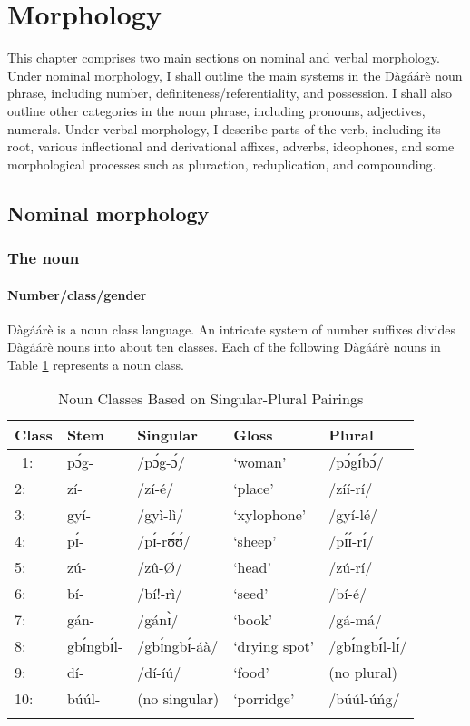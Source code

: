\section{Morphology}

This chapter comprises two main sections on nominal and verbal morphology. Under
nominal morphology, I shall outline the main systems in the Dàgáárè noun phrase, including
number, definiteness/referentiality, and possession. I shall also outline other categories in the
noun phrase, including pronouns, adjectives, numerals. Under verbal morphology, I describe
parts of the verb, including its root, various inflectional and derivational affixes, adverbs,
ideophones, and some morphological processes such as pluraction, reduplication, and
compounding.

\subsection{Nominal morphology}
\subsubsection{ The noun}
\paragraph{Number/class/gender}

Dàgáárè is a noun class language. An intricate system of number suffixes divides Dàgáárè nouns into about ten classes. Each of the following Dàgáárè nouns in  Table  \ref{tab:classstems}
represents a noun class.
\begin{table}[]
    \centering
    \begin{tabular}{lllll}\lsptoprule
Class & Stem & Singular & Gloss &Plural\\\midrule
   \ 1: & pɔ́g-& /pɔ́g-ɔ́/& ‘woman’& /pɔ́gɪ́bɔ́/  \\
2: &zí- &/zí-é/ &‘place’&/zíí-rí/ \\
3:& gyí-& /gyì-lì/& ‘xylophone’& /gyí-lé/\\
4: &pɪ́-& /pɪ́-rʊ́ʊ́/& ‘sheep’& /pɪ́ɪ́-rɪ́/\\
5: &zú-& /zû-Ø/& ‘head’ &/zú-rí/\\
6: &bí-& /bí!-rì/ &‘seed’ &/bí-é/\\
7: &gán- &/gánɪ̀/ &‘book’ &/gá-má/\\
8: &gbɪ́ngbɪ́l-& /gbɪ́ngbɪ́-áà/& ‘drying spot’& /gbɪ́ngbɪ́l-lɪ́/\\
9: &dí-& /dí-íú/& ‘food’& (no plural)\\
10: & búúl- &(no singular) &‘porridge’& /búúl-úńg/\\\lspbottomrule
    \end{tabular}
    \caption{Noun Classes Based on Singular-Plural Pairings}
    \label{tab:classstems}
\end{table}

